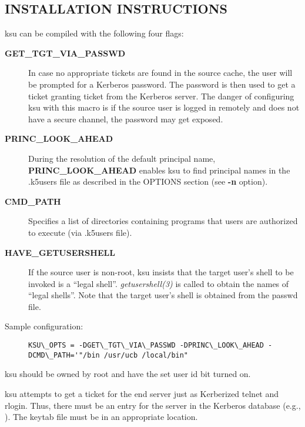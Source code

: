 \documentclass[letterpaper,10pt,english]{sphinxmanual}
\begin{document}
\subsection{INSTALLATION INSTRUCTIONS}
\label{user/user_commands/ksu:installation-instructions}
ksu can be compiled with the following four flags:
\begin{description}
\item[{\textbf{GET\_TGT\_VIA\_PASSWD}}] \leavevmode
In case no appropriate tickets are found in the source cache, the
user will be prompted for a Kerberos password.  The password is
then used to get a ticket granting ticket from the Kerberos
server.  The danger of configuring ksu with this macro is if the
source user is logged in remotely and does not have a secure
channel, the password may get exposed.

\item[{\textbf{PRINC\_LOOK\_AHEAD}}] \leavevmode
During the resolution of the default principal name,
\textbf{PRINC\_LOOK\_AHEAD} enables ksu to find principal names in
the .k5users file as described in the OPTIONS section
(see \textbf{-n} option).

\item[{\textbf{CMD\_PATH}}] \leavevmode
Specifies a list of directories containing programs that users are
authorized to execute (via .k5users file).

\item[{\textbf{HAVE\_GETUSERSHELL}}] \leavevmode
If the source user is non-root, ksu insists that the target user's
shell to be invoked is a ``legal shell''.  \emph{getusershell(3)} is
called to obtain the names of ``legal shells''.  Note that the
target user's shell is obtained from the passwd file.

\item[{Sample configuration:}] \leavevmode
\begin{Verbatim}[commandchars=\\\{\}]
KSU\_OPTS = -DGET\_TGT\_VIA\_PASSWD -DPRINC\_LOOK\_AHEAD -DCMD\_PATH='"/bin /usr/ucb /local/bin"
\end{Verbatim}

\end{description}

ksu should be owned by root and have the set user id bit turned on.

ksu attempts to get a ticket for the end server just as Kerberized
telnet and rlogin.  Thus, there must be an entry for the server in the
Kerberos database (e.g., ).  The keytab
file must be in an appropriate location.
\end{document}
